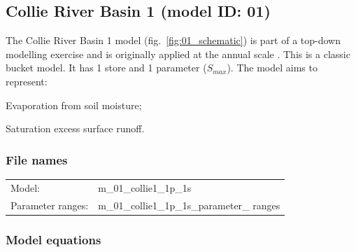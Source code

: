 \subsection{Collie River Basin 1 (model ID: 01)}
The Collie River Basin 1 model (fig.~\ref{fig:01_schematic}) is part of a top-down modelling exercise and is originally applied at the annual scale \citep{Jothityangkoon2001}. This is a classic bucket model. It has 1 store and 1 parameter ($S_{max}$). The model aims to represent:

\begin{itemizecompact}
\item Evaporation from soil moisture;
\item Saturation excess surface runoff.
\end{itemizecompact}

\subsubsection{File names}
\begin{tabular}{@{}ll}
Model: &m\_01\_collie1\_1p\_1s \\
Parameter ranges: &m\_01\_collie1\_1p\_1s\_parameter\_ ranges \\
\end{tabular}


\subsubsection{Model equations}

